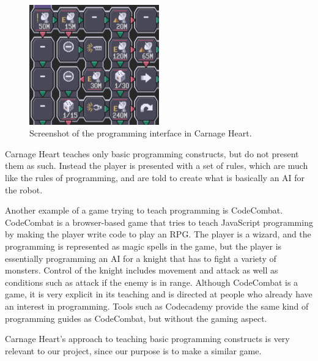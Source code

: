 \begin{figure}[hptb]
  \centering
    \includegraphics[width=0.5\textwidth]{img/CarnageHeartSoftware.png}
  \caption{Screenshot of the programming interface in Carnage Heart.\cite{carnageheartsoftware}}
  \label{fig:carnageheartsoftware}
\end{figure}

Carnage Heart teaches only basic programming constructs, but do not present them as such. Instead the player is presented with a set of rules, which are much like the rules of programming, and are told to create what is basically an AI for the robot.

Another example of a game trying to teach programming is CodeCombat. \cite{codecombat} CodeCombat is a browser-based game that tries to teach JavaScript programming by making the player write code to play an RPG. The player is a wizard, and the programming is represented as magic spells in the game, but the player is essentially programming an AI for a knight that has to fight a variety of monsters. Control of the knight includes movement and attack as well as conditions such as attack if the enemy is in range.
Although CodeCombat is a game, it is very explicit in its teaching and is directed at people who already have an interest in programming. Tools such as Codecademy provide the same kind of programming guides as CodeCombat, but without the gaming aspect.\cite{codecademy}

Carnage Heart's approach to teaching basic programming constructs is very relevant to our project, since our purpose is to make a similar game.